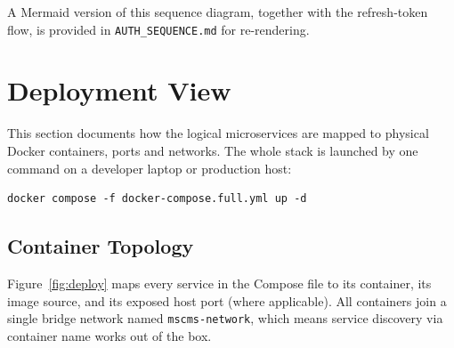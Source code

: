 \documentclass[12pt,a4paper,oneside]{report}
\begin{document}
A Mermaid version of this sequence diagram, together with the refresh-token
flow, is provided in \texttt{AUTH\_SEQUENCE.md} for re-rendering.

\section{Deployment View}
\label{sec:deploy}

This section documents how the logical microservices are mapped to
physical Docker containers, ports and networks. The whole stack is
launched by one command on a developer laptop or production host:
\begin{verbatim}
docker compose -f docker-compose.full.yml up -d
\end{verbatim}

\subsection{Container Topology}
Figure~\ref{fig:deploy} maps every service in the Compose file to its
container, its image source, and its exposed host port (where applicable).
All containers join a single bridge network named \texttt{mscms-network},
which means service discovery via container name works out of the box.
\end{document}
